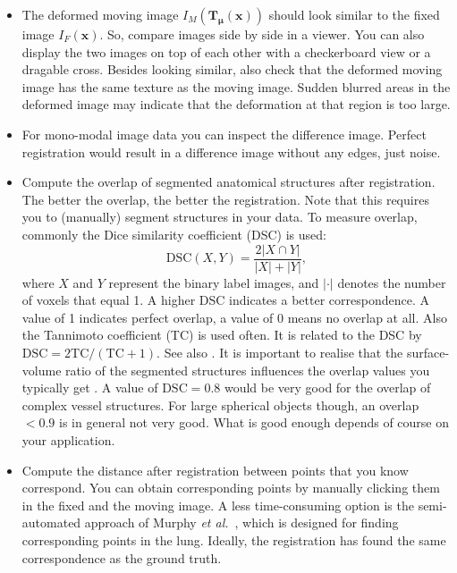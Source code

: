 \documentclass[]{report}
\newcommand{\etal}{\emph{et al.}}
\newcommand{\vx}{\bm{x}}
\newcommand{\vmu}{\bm{\mu}}
\newcommand{\vT}{\bm{T}}
\begin{document}
\begin{itemize}
\item The deformed moving image $I_M(\vT_{\vmu}(\vx))$ should
look similar to the fixed image $I_F(\vx)$. So, compare images side
by side in a viewer. You can also display the two images on top of
each other with a checkerboard view or a dragable cross. Besides
looking similar, also check that the deformed moving image has the
same texture as the moving image. Sudden blurred areas in the
deformed image may indicate that the deformation at that region is
too large.

\item For mono-modal image data you can inspect the difference
image. Perfect registration would result in a difference image
without any edges, just noise.

\item Compute the overlap of segmented anatomical structures
after registration. The better the overlap, the better the
registration. Note that this requires you to (manually) segment
structures in your data. To measure overlap, commonly the Dice
similarity coefficient (DSC) is used:
\begin{equation}
  \mathrm{DSC}(X,Y) = \frac{2 |X \cap Y|}{|X|+|Y|},
\end{equation}
where $X$ and $Y$ represent the binary label images, and $|\cdot|$
denotes the number of voxels that equal 1. A higher DSC indicates a
better correspondence. A value of 1 indicates perfect overlap, a
value of 0 means no overlap at all. Also the Tannimoto coefficient
(TC) is used often. It is related to the DSC by
$\mathrm{DSC}=2\mathrm{TC}/(\mathrm{TC}+1)$. See also
\cite{Cru06:Generalized}. It is important to realise that the
surface-volume ratio of the segmented structures influences the
overlap values you typically get \citep{Roh04:Evaluation}. A value
of $\mathrm{DSC}=0.8$ would be very good for the overlap of complex
vessel structures. For large spherical objects though, an overlap
$<0.9$ is in general not very good. What is good enough depends of
course on your application.

\item Compute the distance after registration between points that
you know correspond. You can obtain corresponding points by manually
clicking them in the fixed and the moving image. A less
time-consuming option is the semi-automated approach of Murphy
\etal\ \cite{Murphy08}, which is designed for finding corresponding
points in the lung. Ideally, the registration has found the same
correspondence as the ground truth.


\end{itemize}
\end{document}
